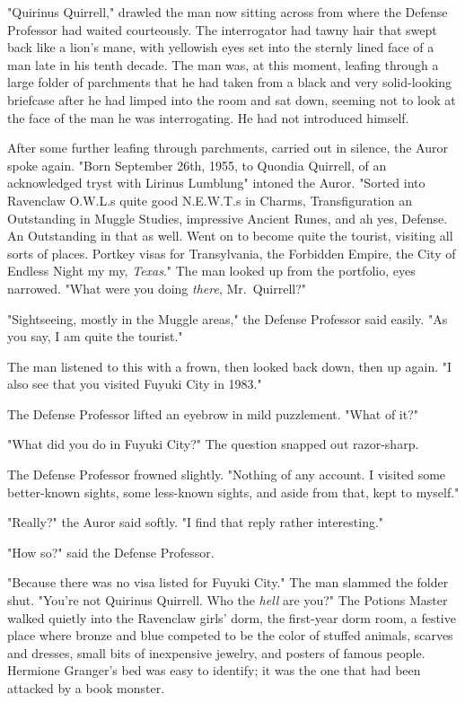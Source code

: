 "Quirinus{\el} Quirrell," drawled the man now sitting across from where the
Defense Professor had waited courteously. The interrogator had tawny hair that
swept back like a lion's mane, with yellowish eyes set into the sternly lined
face of a man late in his tenth decade. The man was, at this moment, leafing
through a large folder of parchments that he had taken from a black and very
solid-looking briefcase after he had limped into the room and sat down, seeming
not to look at the face of the man he was interrogating. He had not introduced
himself.

After some further leafing through parchments, carried out in silence, the
Auror spoke again. "Born September 26th, 1955, to Quondia Quirrell, of
an acknowledged tryst with Lirinus Lumblung{\el}" intoned the Auror. "Sorted
into Ravenclaw{\el} O.W.L.s quite good{\el} N.E.W.T.s in Charms,
Transfiguration{\el} an Outstanding in Muggle Studies, impressive{\el}
Ancient Runes, and ah yes, Defense. An Outstanding in that as well. Went on to
become quite the tourist, visiting all sorts of places. Portkey visas for
Transylvania, the Forbidden Empire, the City of Endless Night{\el} my my,
\emph{Texas}." The man looked up from the portfolio, eyes narrowed. "What were
you doing \emph{there}, Mr.~Quirrell?"

"Sightseeing, mostly in the Muggle areas," the Defense Professor said easily.
"As you say, I am quite the tourist."

The man listened to this with a frown, then looked back down, then up again. "I
also see that you visited Fuyuki City in 1983."

The Defense Professor lifted an eyebrow in mild puzzlement. "What of it?"

"What did you do in Fuyuki City?" The question snapped out razor-sharp.

The Defense Professor frowned slightly. "Nothing of any account. I visited some
better-known sights, some less-known sights, and aside from that, kept to
myself."

"Really?" the Auror said softly. "I find that reply rather interesting."

"How so?" said the Defense Professor.

"Because there was no visa listed for Fuyuki City." The man slammed the folder
shut. "You're not Quirinus Quirrell. Who the \emph{hell} are you?"
\sbreak
The Potions Master walked quietly into the Ravenclaw girls' dorm, the
first-year dorm room, a festive place where bronze and blue competed to be the
color of stuffed animals, scarves and dresses, small bits of inexpensive
jewelry, and posters of famous people. Hermione Granger's bed was easy to
identify; it was the one that had been attacked by a book monster.

